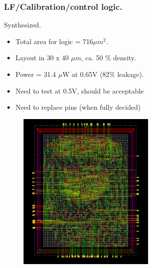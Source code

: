 \documentclass[t, screen, aspectratio=43]{beamer}
\begin{document}
\begin{frame}
	\frametitle{LF/Calibration/control logic.}
	\begin{block}{Synthesized.}
		\begin{minipage}{4cm}
			\vspace{1em}
			\tiny
			\begin{itemize}[itemsep=4pt,label=\protect---]
			        \item Total area for logic = 716$\mu m^2$.
			        \item Layout in 30 x 40 $\mu m$, ca. 50 \% density.
			        \item Power = 31.4 $\mu$W at 0.65V (82\% leakage).
			        \item Need to test at 0.5V, should be acceptable
			        \item Need to replace pins (when fully decided)
			\end{itemize}
		\end{minipage}%
		\begin{minipage}{8cm}
			\begin{figure}[htb!]
			        \centering
			        \includegraphics[width=0.6\textwidth, angle=0]{lf_layout2}
			\end{figure}
		\end{minipage}%

	\end{block}	
\end{frame}
\end{document}
